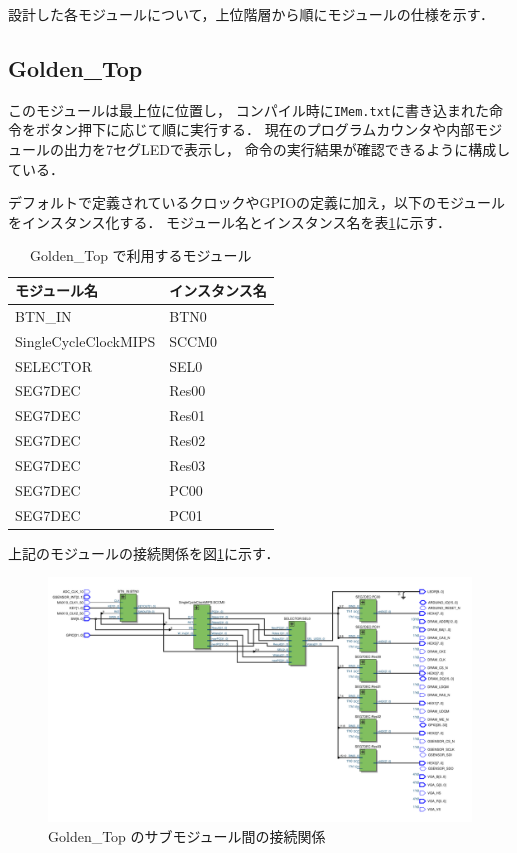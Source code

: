 
設計した各モジュールについて，上位階層から順にモジュールの仕様を示す．

\subsection{Golden\_Top}
このモジュールは最上位に位置し，
コンパイル時に\texttt{IMem.txt}に書き込まれた命令をボタン押下に応じて順に実行する．
現在のプログラムカウンタや内部モジュールの出力を7セグLEDで表示し，
命令の実行結果が確認できるように構成している．

デフォルトで定義されているクロックやGPIOの定義に加え，以下のモジュールをインスタンス化する．
モジュール名とインスタンス名を表\ref{tab:golden_top_mod}に示す．
\begin{table}[h]
  \centering
  \caption{Golden\_Top で利用するモジュール}
  \begin{tabular}{l|l}
    モジュール名 & インスタンス名 \\
    \hline
    BTN\_IN & BTN0 \\
    SingleCycleClockMIPS & SCCM0 \\
    SELECTOR & SEL0 \\
    SEG7DEC & Res00 \\
    SEG7DEC & Res01 \\
    SEG7DEC & Res02 \\
    SEG7DEC & Res03 \\
    SEG7DEC & PC00 \\
    SEG7DEC & PC01
  \end{tabular}
  \label{tab:golden_top_mod}
\end{table}
上記のモジュールの接続関係を図\ref{fig:golden_top_block}に示す．
\begin{figure}[h]
  \centerning
  \includegraphics[width=\textwidth]{myRTL.png}
  \caption{Golden\_Top のサブモジュール間の接続関係}
  \label{fig:golden_top_block}
\end{figure}


